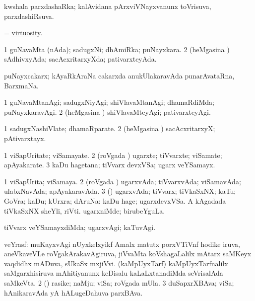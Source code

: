 \bentry
{} 
\gl{\gu}
\expl{}
\bmng
 kwshala parxdashaRka; kalAvidana pArxviVNayxvanunx toVrisuva, parxdashiRsuva. 
\emng
\eentry

\bentry
{} 
\gl{\nA}
\expl{}
\bmng
 = \hyperlink{virtuosity}{virtuosity}. 
\emng
\eentry

\bentry
{} 
\gl{\gu}
\expl{}
\bmng
\bnum
\num{1} guNavaMta (nAda); sadugxNi; dhAmiRka; puNayxkara. 
\num{2} (heMgasina \vi) sAdhivxyAda; sacAcxritarxyXda; pativarxteyAda. 
\enum
\emng
\eentry

\bentry
{}
\gl{\nA}
\expl{}
\bmng
 puNayxcakarx; kAyaRkAraNa cakarxda anukUlakaravAda punarAvataRna, BarxmaNa. 
\emng
\eentry

\bentry
{} 
\gl{\kirxvi}
\expl{}
\bmng
\bnum
\num{1} guNavaMtanAgi; sadugxNiyAgi; shiVlavaMtanAgi; dhamaRdiMda; puNayxkaravAgi. 
\num{2} (heMgasina \vi) shiVlavaMteyAgi; pativarxteyAgi. 
\enum
\emng
\eentry

\bentry 
{} 
\gl{\nA}
\expl{}
\bmng
\bnum
\num{1} sadugxNashiVlate; dhamaRparate. 
\num{2} (heMgasina \vi) sacAcxritarxyX; pAtivarxtayx. 
\enum
\emng
\eentry

\bentry 
{} 
\gl{\nA}
\expl{}
\bmng
\bnum
\num{1} viSapUritate; viSamayate. 
\num{2} (roVgada \vi) ugarxte; tiVvarxte; viSamate; apAyakarate. 
\num{3} kaDu hagetana; tiVvarx devxVSa; ugarx veYSamayx. 
\enum
\emng
\eentry

\bentry
{} 
\gl{\gu}
\expl{}
\bmng
\bnum
\num{1} viSapUrita; viSamaya. 
\num{2} (roVgada \vi) ugarxvAda; tiVvarxvAda; viSamavAda; ulabxNavAda; apAyakaravAda. 
\num{3} (\rUpa) ugarxvAda; tiVvarx; tiVkaSxNX; kaTu; GoVra; kaDu; kUrxra; dAruNa:  kaDu hage; ugarxdevxVSa.  A kAgadada tiVkaSxNX sheYli, riVti.  ugarxniMde; birubeYguLa. 
\enum
\emng
\eentry

\bentry 
{} 
\gl{\kirxvi}
\expl{}
\bmng
 tiVvarx veYSamayxdiMda; ugarxvAgi; kaTuvAgi. 
\emng
\eentry

\bentry 
{} 
\gl{\nA}
\expl{}
\bmng
\bnum
{} 
\banum
{} veYrasf: muKayxvAgi nUyxkelxyikf Amalx matutx porxVTiVnf hodike iruva, aneVkaveVLe roVgakArakavAgiruva, jiVvaMta koVshagaLalilx mAtarx saMKeyx vaqdidhx mADuva, sUkaSx mxjiVvi. 
 (kaMpUyxTarf) kaMpUyxTarfnalilx saMgarxhisiruva mAhitiyanunx keDisalu kaLaLxtanadiMda seVrisalAda saMkeVta. 
\eanum
\numie
\num{2} (\pArxparx) rasike; naMju; viSa; roVgada mUla. 
\num{3} duSapxrXBAva; viSa; hAnikaravAda yA hALugeDahuva parxBAva. 
\enum
\emng
\eentry

